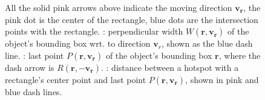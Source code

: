 \begin{figure}
\begin{subfigure}{0.42\linewidth}
    \subcaption{}
    \label{subfig:semantic-last-pt-dist}
\end{subfigure}%
\caption{All the solid pink arrows above indicate the moving direction $\bm{v_r}$, the pink dot is the center of the rectangle, blue dots are the intersection points with the rectangle. : perpendicular width $W(\bm{r}, \bm{v_r})$ of the object's bounding box wrt. to  direction $\bm{v}_{r}$, shown as the blue dash line. : last point $P(\bm{r}, \bm{v_r})$ of the object's bounding box $\bm{r}$, where the dash arrow is $R(\bm{r}, \bm{-v_r})$. : distance between a hotspot with a rectangle's center point and last point $P(\bm{r}, \bm{v_r})$, shown in pink and blue dash lines.}
\label{fig:semantic-perp-width}
\end{figure}